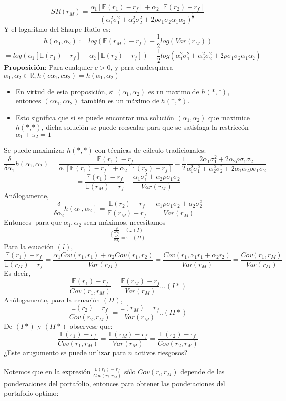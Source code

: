 \documentclass[12pts]{extarticle}
\begin{document}
$$ SR(r_M)= \frac{\alpha_1 [\mathbb{E}(r_1) -r_f]+\alpha_2 [\mathbb{E}(r_2) -r_f]}{(\alpha_1^2 \sigma_1^2 + \alpha_2^2 \sigma_2^2 + 2\rho\sigma_1\sigma_2\alpha_1\alpha_2)^\frac{1}{2}}$$
Y el logaritmo del Sharpe-Ratio es: $$ h(\alpha_1 , \alpha_2) := log(\mathbb{E}(r_M)-r_f)-\frac{1}{2} log(Var(r_M))$$ 
$$=log(\alpha_1 [\mathbb{E}(r_1)- r_f]+ \alpha_2 [\mathbb{E}(r_2) -r_f])- \frac{1}{2} log(\alpha_1^2  \sigma_1^2 + \alpha_2^2 \sigma_2^2 +2 \rho \sigma_1 \sigma_2 \alpha_1 \alpha_2)$$
\textbf{Proposición}: Para cualquier $c>0$, y para cualesquiera $\alpha_1,\alpha_2 \in \mathbb{R},     h(c\alpha_1, c\alpha_2)= h(\alpha_1, \alpha_2)$
\\ \begin{itemize}
 \item En  virtud de esta proposición, si $(\alpha_1, \alpha_2)$ es un maximo de $h(*,*)$, entonces $(c\alpha_1, c\alpha_2)$ también es un máximo de $h(*,*)$. 
\item Esto significa que si se puede encontrar una solución $(\alpha_1, \alpha_2)$ que maximice $h(*,*)$, dicha solución se puede reescalar para que se satisfaga la restriccón $\alpha_1 + \alpha_2 =1$
\end{itemize} 
Se puede maximizar $h(*,*)$ con técnicas de cálculo tradicionales:
$$\frac{\delta}{\delta \alpha_1} h(\alpha_1, \alpha_2) = \frac{\mathbb{E}(r_1) -r_f}{\alpha_1[\mathbb{E}(r_1)-r_f]+\alpha_2[\mathbb{E}(r_2)-r_f]} - \frac{1}{2} \frac{2\alpha_1\sigma_1^2 + 2\alpha_2 \rho\sigma_1\sigma_2}{\alpha_1^2  \sigma_1^2 +\alpha_2^2 \sigma_2^2 +2\alpha_1\alpha_2\rho\sigma_1\sigma_2}$$  $$=\frac{\mathbb{E}(r_1)-r_f}{\mathbb{E}(r_M)-r_f} -\frac{\alpha_1\sigma_1^2 +\alpha_2\rho\sigma_1\sigma_2}{Var(r_M)}$$
Análogamente, $$\frac{\delta}{\delta\alpha_2} h(\alpha_1,\alpha_2)= \frac{\mathbb{E}(r_2)-r_f}{\mathbb{E}(r_M)-r_f} - \frac{\alpha_1\rho\sigma_1\sigma_2 + \alpha_2\sigma_2^2}{Var(r_M)}$$
Entonces, para que $\alpha_1, \alpha_2$ sean máximos, necesitamos $$\bigg\{_{\frac{\delta h}{\delta\alpha_2}=0 ...(II)}  ^{\frac{\delta}{\delta\alpha_2}=0 ...(I)}$$
Para la ecuación $(I)$, 
$$ \frac{\mathbb{E}(r_1) -r_f}{\mathbb{E}(r_M)-r_f}=\frac{\alpha_1 Cov(r_1, r_1) +\alpha_2 Cov(r_1, r_2)}{Var(r_M)} = \frac{Cov(r_1, \alpha_1 r_1 +\alpha_2 r_2)}{Var(r_M)} = \frac{Cov(r_1, r_M)}{Var(r_M)}$$
Es decir, $$\frac{\mathbb{E}(r_1)-r_f}{Cov(r_1, r_M)}=\frac{\mathbb{E}(r_M)-r_f}{Var(r_M)} ... (I*)$$
Análogamente, para la ecuación $(II)$,  $$\frac{\mathbb{E}(r_2) -r_f}{Cov(r_2, r_M)}=\frac{\mathbb{E}(r_M) -r_f}{Var(r_M)} ..(II*)$$ 
De $(I*)$ y $(II*)$ observese que: $$\frac{\mathbb{E}(r_1)-r_f}{Cov(r_1, r_M)}=\frac{\mathbb{E}(r_M)-r_f}{Var(r_M)}=\frac{\mathbb{E}(r_2) -r_f}{Cov(r_2, r_M)}$$
¿Este arugumento se puede urilizar para $n$ activos riesgosos? 
\\  \\ Notemos que en la expresión $\frac{\mathbb{E}(r_i) -r_f}{Cov(r_i, r_M)}$ sólo $Cov(r_i, r_M)$ depende de las ponderaciones del portafolio, entonces para obtener las ponderaciones del portafolio optimo: 
\end{document}

